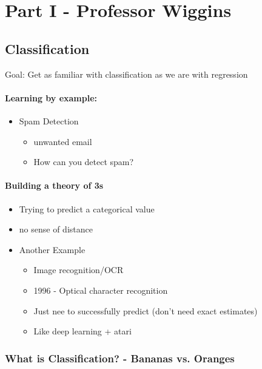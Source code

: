 
\section{Part I - Professor Wiggins}
\subsection{Classification}

Goal: Get as familiar with classification as we are with regression	

\paragraph{Learning by example:}
\begin{itemize}
	\item Spam Detection
	\begin{itemize}
		\item unwanted email 
		\item How can you detect spam?
	\end{itemize}
\end{itemize}

\paragraph{Building a theory of 3s}
\begin{itemize}
	\item Trying to predict a categorical value
	\item no sense of distance
	\item Another Example
	\begin{itemize}
		\item Image recognition/OCR 
		\item 1996 - Optical character recognition
		\item Just nee to successfully predict (don't need exact estimates)
		\item Like deep learning + atari
	\end{itemize}
\end{itemize}

\subsubsection{What is Classification? - Bananas vs. Oranges}

